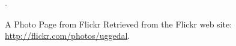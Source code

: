 \begin{figure}
\begin{adjustwidth*}{0em}{-\wholemargin}
\begin{minipage}[t]{0.475\wholewidth}
      \caption[Flickr Photo Page]{%
         A Photo Page from Flickr
         Retrieved from the Flickr web site:
        \url{http://flickr.com/photos/uggedal}.}
      \label{figure:scrsh.flickr.photo}
    \end{minipage}
  \end{adjustwidth*}
\end{figure}
